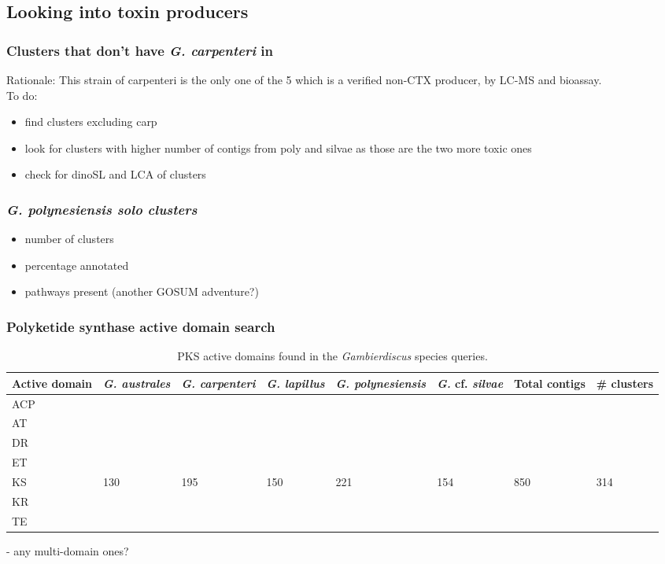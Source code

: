 \documentclass[12pt]{article}
\begin{document}
\subsection*{Looking into toxin producers}
\subsubsection*{Clusters that don't have \textit{G. carpenteri} in}
Rationale: This strain of carpenteri is the only one of the 5 which is a verified non-CTX producer, by LC-MS and bioassay.\\
To do:
\begin{itemize}
\item find clusters excluding carp
\item look for clusters with higher number of contigs from poly and silvae as those are the two more toxic ones
\item check for dinoSL and LCA of clusters
\end{itemize}

\subsubsection*{\textit{G. polynesiensis solo clusters}}
\begin{itemize}
\item number of clusters
\item percentage annotated
\item pathways present (another GOSUM adventure?)

\end{itemize}


\subsubsection*{Polyketide synthase active domain search}

\begin{table}
\caption{PKS active domains found in the \emph{Gambierdiscus} species queries.}
\label{tbl:PKSTable}
\begin{tabular}{ | p{1.65cm} | p{1.5cm} | p{1.5cm} | p{1.5cm} | p{1.7cm} | p{1.5cm}| p{1.5cm}| p{1.5cm}|}
\hline
\textbf{Active domain}& \textit{G. australes}& \emph{G. carpenteri}&\emph{G. lapillus}&\emph{G. polynesiensis}&\emph{G.} cf. \emph{silvae}&\textbf{Total contigs}&\textbf{\# clusters}\\
\hline
ACP&&&&&&&\\
\hline
AT&&&&&&&\\
\hline
DR&&&&&&&\\
\hline
ET&&&&&&&\\
\hline
KS&130&195&150&221&154&850&314\\
\hline
KR&&&&&&&\\
\hline
TE&&&&&&&\\
\hline
\end{tabular}
\end{table}
\FloatBarrier
- any multi-domain ones?\\
\end{document}
